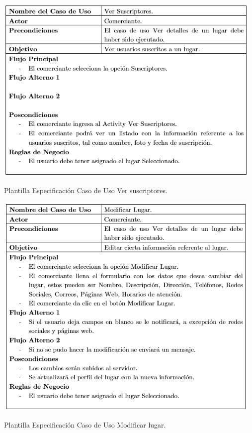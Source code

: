\documentclass[12pt,letterpaper,openany]{book}
\begin{document}
\begin{table}[H]
\centering
\includegraphics[width=13cm]{./imagenes/PCU/ver_suscriptores}
\caption{Plantilla Especificación Caso de Uso Ver suscriptores.}
\end{table}

\begin{table}[H]
\centering
\includegraphics[width=13cm]{./imagenes/PCU/modificar_lugar}
\caption{Plantilla Especificación Caso de Uso Modificar lugar.}
\end{table}
\end{document}
